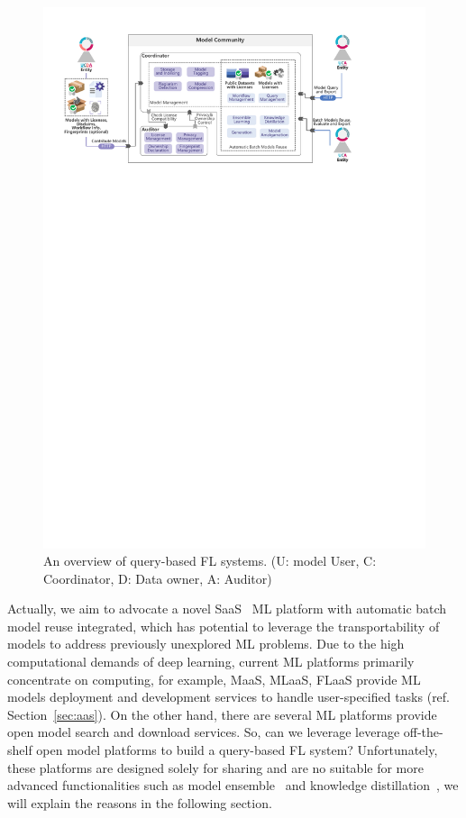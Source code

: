 \begin{figure}[t]
  \centering
  \includegraphics[width=\linewidth]{fig/query_frame.pdf}
  \caption{An overview of query-based FL systems. (U: model User, C: Coordinator, D: Data owner, A: Auditor)}
  \Description{}
  \label{fig:query}
\end{figure}

Actually, we aim to advocate a novel SaaS~\cite{brereton1999future} ML platform with automatic batch model reuse integrated, which has potential to leverage the transportability of models to address previously unexplored ML problems.
Due to the high computational demands of deep learning, current ML platforms primarily concentrate on computing, for example, MaaS, MLaaS, FLaaS provide ML models deployment and development services to handle user-specified tasks (ref. Section~\ref{sec:aas}).
On the other hand, there are several ML platforms provide open model search and download services. 
So, can we leverage leverage off-the-shelf open model platforms to build a query-based FL system?
Unfortunately, these platforms are designed solely for sharing and are no suitable for more advanced functionalities such as model ensemble~\cite{jacobs1991adaptive} and knowledge distillation~\cite{hinton2015distilling}, we will explain the reasons in the following section.

